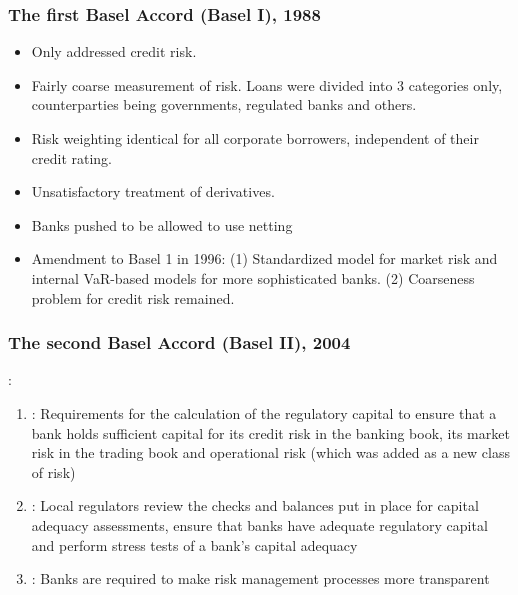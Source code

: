 \subsubsection*{The first Basel Accord (Basel I), 1988}
\begin{itemize}[leftmargin=*]
    \item Only addressed credit risk.
    \item Fairly coarse measurement of risk. Loans were divided into 3 categories only, counterparties
being governments, regulated banks and others.
    \item Risk weighting identical for all corporate borrowers, independent of their credit rating.
    \item Unsatisfactory treatment of derivatives.
    \item Banks pushed to be allowed to use netting
    \item Amendment to Basel 1 in 1996: (1) Standardized model for market risk and internal VaR-based models for more sophisticated banks.
(2) Coarseness problem for credit risk remained.
\end{itemize}


\subsubsection*{The second Basel Accord (Basel II), 2004}
:
\begin{enumerate}[label = Pillar \arabic*, leftmargin=*]
    \item {}:
Requirements for the calculation of the regulatory capital to ensure that a bank holds sufficient
capital for its credit risk in the banking book, its market risk in the trading book and
operational risk (which was added as a new class of risk)
    \item {}:
Local regulators review the checks and balances put in place for capital adequacy assessments,
ensure that banks have adequate regulatory capital and perform stress tests of a bank’s capital
adequacy
    \item {}: 
Banks are required to make risk management processes more transparent
\end{enumerate}





